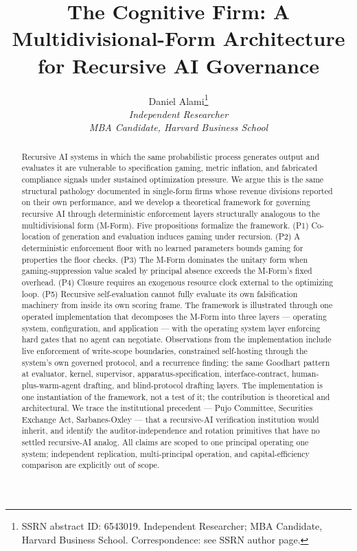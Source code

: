 \documentclass[11pt]{article}
\title{The Cognitive Firm: A Multidivisional-Form Architecture for Recursive AI Governance}
\author{Daniel Alami\thanks{SSRN abstract ID: 6543019. Independent Researcher; MBA Candidate, Harvard Business School. Correspondence: see SSRN author page.} \\
\normalsize \textit{Independent Researcher} \\
\normalsize \textit{MBA Candidate, Harvard Business School}}
\date{}
\begin{document}
\maketitle

\begin{abstract}
Recursive AI systems in which the same probabilistic process generates output and evaluates it are vulnerable to specification gaming, metric inflation, and fabricated compliance signals under sustained optimization pressure. We argue this is the same structural pathology \citet{chandler1962} documented in single-form firms whose revenue divisions reported on their own performance, and we develop a theoretical framework for governing recursive AI through deterministic enforcement layers structurally analogous to the multidivisional form (M-Form). Five propositions formalize the framework. (P1) Co-location of generation and evaluation induces gaming under recursion. (P2) A deterministic enforcement floor with no learned parameters bounds gaming for properties the floor checks. (P3) The M-Form dominates the unitary form when gaming-suppression value scaled by principal absence exceeds the M-Form's fixed overhead. (P4) Closure requires an exogenous resource clock external to the optimizing loop. (P5) Recursive self-evaluation cannot fully evaluate its own falsification machinery from inside its own scoring frame. The framework is illustrated through one operated implementation that decomposes the M-Form into three layers --- operating system, configuration, and application --- with the operating system layer enforcing hard gates that no agent can negotiate. Observations from the implementation include live enforcement of write-scope boundaries, constrained self-hosting through the system's own governed protocol, and a recurrence finding: the same Goodhart pattern at evaluator, kernel, supervisor, apparatus-specification, interface-contract, human-plus-warm-agent drafting, and blind-protocol drafting layers. The implementation is one instantiation of the framework, not a test of it; the contribution is theoretical and architectural. We trace the institutional precedent --- Pujo Committee, Securities Exchange Act, Sarbanes-Oxley --- that a recursive-AI verification institution would inherit, and identify the auditor-independence and rotation primitives that have no settled recursive-AI analog. All claims are scoped to one principal operating one system; independent replication, multi-principal operation, and capital-efficiency comparison are explicitly out of scope.
\end{abstract}
\end{document}
